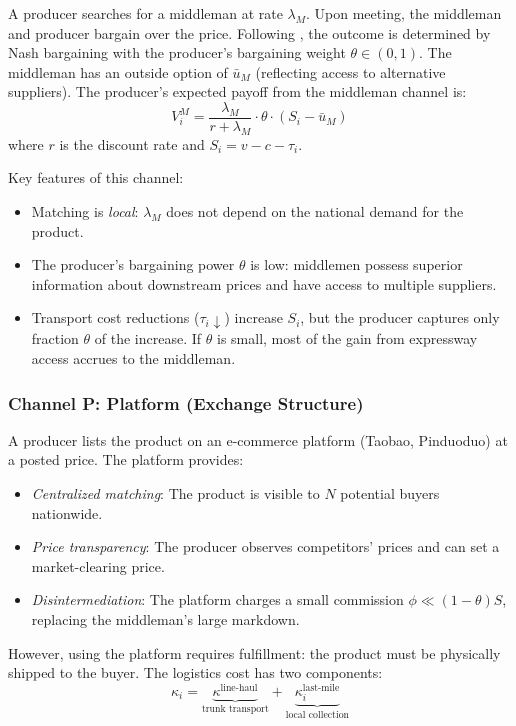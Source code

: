 \documentclass[12pt]{article}
\begin{document}
A producer searches for a middleman at rate $\lambda_M$. Upon meeting, the middleman and producer bargain over the price. Following \citet{dgp2005}, the outcome is determined by Nash bargaining with the producer's bargaining weight $\theta \in (0,1)$. The middleman has an outside option of $\bar{u}_M$ (reflecting access to alternative suppliers). The producer's expected payoff from the middleman channel is:
\begin{equation}
    V^M_i = \frac{\lambda_M}{r + \lambda_M} \cdot \theta \cdot (S_i - \bar{u}_M)
\end{equation}
where $r$ is the discount rate and $S_i = v - c - \tau_i$.

Key features of this channel:
\begin{itemize}[nosep]
    \item Matching is \textit{local}: $\lambda_M$ does not depend on the national demand for the product.
    \item The producer's bargaining power $\theta$ is low: middlemen possess superior information about downstream prices and have access to multiple suppliers.
    \item Transport cost reductions ($\tau_i \downarrow$) increase $S_i$, but the producer captures only fraction $\theta$ of the increase. If $\theta$ is small, most of the gain from expressway access accrues to the middleman.
\end{itemize}

\subsubsection{Channel P: Platform (Exchange Structure)}

A producer lists the product on an e-commerce platform (Taobao, Pinduoduo) at a posted price. The platform provides:
\begin{itemize}[nosep]
    \item \textit{Centralized matching}: The product is visible to $N$ potential buyers nationwide.
    \item \textit{Price transparency}: The producer observes competitors' prices and can set a market-clearing price.
    \item \textit{Disintermediation}: The platform charges a small commission $\phi \ll (1-\theta)S$, replacing the middleman's large markdown.
\end{itemize}

However, using the platform requires fulfillment: the product must be physically shipped to the buyer. The logistics cost has two components:
\begin{equation}
    \kappa_i = \underbrace{\kappa^{\text{line-haul}}}_{\text{trunk transport}} + \underbrace{\kappa^{\text{last-mile}}_i}_{\text{local collection}}
\end{equation}
\end{document}
